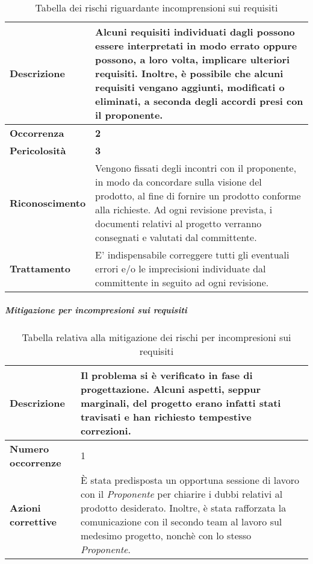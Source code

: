 \begin{table}[H]
	\begin{center}
		\begin{tabular}{|l | p{11cm}|}
			\hline
			\textbf{Descrizione}	& Alcuni requisiti individuati dagli \textit{\Anas} possono essere interpretati in modo errato oppure possono, a loro volta, implicare ulteriori requisiti. Inoltre, è possibile che alcuni requisiti vengano aggiunti, modificati o eliminati, a seconda degli accordi presi con il proponente. \\
			\hline
			\textbf{Occorrenza}	&	\textbf{2}	\\
			\hline
			\textbf{Pericolosità}	&	\textbf{3}	\\
			\hline
			\textbf{Riconoscimento}	&	Vengono fissati degli incontri con il proponente, in modo da concordare sulla visione del prodotto, al fine di fornire un prodotto conforme alla richieste. Ad ogni revisione prevista, i documenti relativi al progetto verranno consegnati e valutati dal committente. \\
			\hline
			\textbf{Trattamento}	&	E' indispensabile correggere tutti gli eventuali errori e/o le imprecisioni individuate dal committente in seguito ad ogni revisione.	\\
			\hline
		\end{tabular}
		\caption{Tabella dei rischi riguardante incomprensioni sui requisiti}
	\end{center}
\end{table}

\subparagraph{Mitigazione per incompresioni sui requisiti}

\begin{table}[H]
	\begin{center}
		\begin{tabular}{|l | p{11cm}|}
			\hline
			\textbf{Descrizione}	&  Il problema si è verificato in fase di progettazione. Alcuni aspetti, seppur
			marginali, del progetto erano infatti stati travisati e han richiesto tempestive correzioni.	\\
			\hline
			\textbf{Numero occorrenze} & 1 \\
			\hline
			\textbf{Azioni correttive}	&	\MakeUppercase{è} stata predisposta un opportuna sessione di lavoro con il \textit{Proponente} per chiarire i dubbi relativi al prodotto desiderato. Inoltre, è stata rafforzata la
			comunicazione con il secondo team al lavoro sul medesimo progetto, nonchè con lo stesso
			\textit{Proponente}.	\\
			\hline
		\end{tabular}
		\caption{Tabella relativa alla mitigazione dei rischi per incompresioni sui requisiti}
	\end{center}
\end{table}



